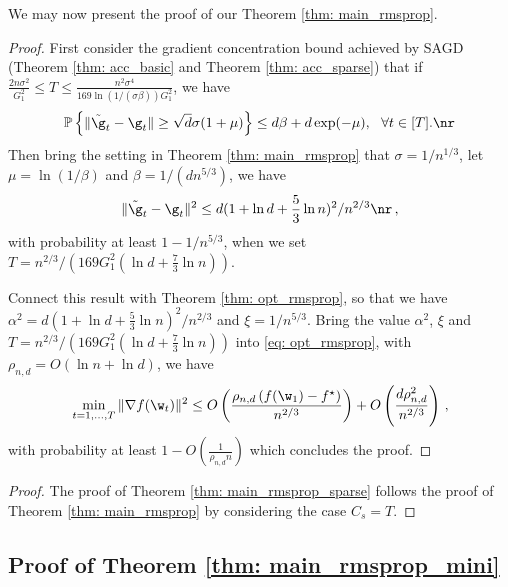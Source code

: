 We may now present the proof of our Theorem \ref{thm: main_rmsprop}.
\theomainrmsprop*
\begin{proof}
First consider the gradient concentration bound achieved by SAGD (Theorem \ref{thm: acc_basic} and Theorem \ref{thm: acc_sparse}) that if $ \frac{2n\sigma^2}{G_1^2}\leq T \leq \frac{n^2 \sigma^4}{169 \ln(1/(\sigma \beta))G_1^2}$, we have 
\begin{equation}
\begin{split}
\mathbb{P}\left\{\|\tilde \g_t - \g_t\| \geq \sqrt{d}\sigma(1+\mu)\right\} \leq d\beta + d\exp(-\mu), \ \ \forall t \in [T].
\end{split} \nr
\end{equation}
Then bring the setting in Theorem \ref{thm: main_rmsprop} that $\sigma = 1/n^{1/3}$, let $\mu = \ln (1/\beta)$ and $\beta = 1/(d n^{5/3})$, we have
\begin{equation}
 \|\tilde \g_t - \g_t\|^2 \leq d(1+\ln d + \frac{5}{3}\ln n)^2/n^{2/3}    \nr  \, ,
\end{equation}
with probability at least $1- 1/n^{5/3}$, when we set $T = n^{2/3}/\left(169G_1^2(\ln d + \frac{7}{3}\ln n)\right)$. 

Connect this result with Theorem \ref{thm: opt_rmsprop}, so that we have $\alpha^2 = d(1+\ln d + \frac{5}{3}\ln n)^2/n^{2/3}$ and $\xi = 1/n^{5/3}$. Bring the value $\alpha^2$, $\xi$ and $T = n^{2/3}/\left(169G_1^2(\ln d + \frac{7}{3}\ln n)\right)$ into \eqref{eq: opt_rmsprop}, with $\rho_{n,d} = O \left(\ln n + \ln d \right)$, we have
\begin{align*}
\min_{t = 1,..., T}\|\nabla f(\w_t)\|^2 \leq O\left( \frac{\rho_{n,d} \left(f(\w_1) - f^\star \right)}{n^{2/3}} \right) + O \left( \frac{d \rho_{n,d}^2}{n^{2/3}}\right)\, ,
\end{align*}
with probability at least $1-O\left(\frac{1}{\rho_{n,d} n}\right)$ which concludes the proof.
\end{proof}


\theormspropsparse*


\begin{proof}
The proof of Theorem \ref{thm: main_rmsprop_sparse} follows the proof of Theorem \ref{thm: main_rmsprop} by considering the case $C_{s} = T$.
\end{proof}


\subsection{Proof of Theorem \ref{thm: main_rmsprop_mini}} 

